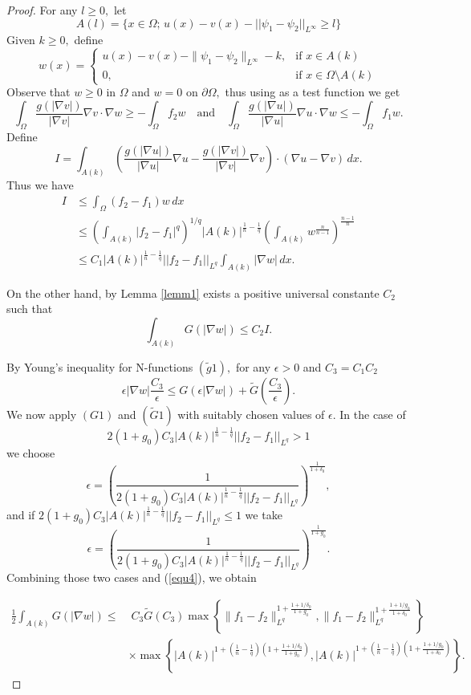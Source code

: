\documentclass[11pt, leqno]{article}
\theoremstyle{definition}
\theoremstyle{remark}
\numberwithin{equation}{section}
\begin{document}
\begin{proof}
  For any $l\geq 0,$ let
  $$A(l)=\{x\in \Omega;\,u(x)-v(x) - ||\psi_1-\psi_2||_{L^\infty}\geq l\} $$
 Given $k\geq 0,$ define
 \[
w(x) = 
\begin{cases}
    u(x) - v(x) - \|\psi_1 - \psi_2\|_{L^\infty} - k, & \text{if } x \in A(k) \\[4pt]
    0, & \text{if } x \in \Omega \setminus A(k)
\end{cases}
\]
Observe that $w\geq 0$ in $\Omega$ and $w=0$ on $\partial\Omega,$ thus using as a test function we get
$$\int_\Omega\frac{g(|\nabla v|)}{|\nabla v|}\nabla v\cdot\nabla w \geq -\int_\Omega f_2w \quad\text{and}\quad \int_\Omega\frac{g(|\nabla u|)}{|\nabla u|}\nabla u\cdot\nabla w \leq -\int_\Omega f_1w. $$
Define
 $$I=\int_{A(k)}\left(\frac{g(|\nabla u|)}{|\nabla u|}\nabla u - \frac{g(|\nabla v|)}{|\nabla v|}\nabla v\right)\cdot\left(\nabla u-\nabla v\right)\,dx. $$
Thus we have
 \begin{align*}
     I &\leq \int_\Omega(f_2-f_1)w\,dx\\
     &\leq \left(\int_{A(k)}|f_2-f_1|^q \right)^{1/q}|A(k)|^{\frac{1}{n}-\frac{1}{q}}\left(\int_{A(k)}w^{\frac{n}{n-1}}\right)^{\frac{n-1}{n}}\\
     &\leq C_1|A(k)|^{\frac{1}{n}-\frac{1}{q}}||f_2-f_1||_{L^q}\int_{A(k)}|\nabla w|\,dx.
 \end{align*}

On the other hand, by Lemma \ref{lemm1} exists a positive universal constante $C_2$ such that
 \begin{equation}\label{equ4}
     \int_{A(k)}G(|\nabla w|) \leq C_2 I.
 \end{equation}

By Young's inequality for N-functions $(\tilde{g}1),$ for any $\epsilon>0$ and $C_3=C_1C_2$
$$ \epsilon|\nabla w|\frac{C_3}{\epsilon} \leq G\left(\epsilon|\nabla w|\right) + \tilde{G}\left(\frac{C_3}{\epsilon}\right). $$
We now apply $(G1)$ and $(\tilde{G}1)$ with suitably chosen values of $\epsilon.$
In the case of $$2(1+g_0)C_3|A(k)|^{\frac{1}{n}-\frac{1}{q}}||f_2-f_1||_{L^q}>1$$ we choose
$$\epsilon= \left(\frac{1}{2(1+g_0)C_3|A(k)|^{\frac{1}{n}-\frac{1}{q}}||f_2-f_1||_{L^q}}\right)^{\frac{1}{1+\delta_0}},$$
and if $2(1+g_0)C_3|A(k)|^{\frac{1}{n}-\frac{1}{q}}||f_2-f_1||_{L^q}\leq 1$ we take
$$\epsilon= \left(\frac{1}{2(1+g_0)C_3|A(k)|^{\frac{1}{n}-\frac{1}{q}}||f_2-f_1||_{L^q}}\right)^{\frac{1}{1+g_0}}.$$
Combining those two cases and (\ref{equ4}), we obtain 

\begin{equation}\label{equ5}
\begin{aligned}
\frac{1}{2}\int_{A(k)} G(|\nabla w|) \leq &\; C_3\tilde{G}(C_3) \max\left\{ 
\|f_1-f_2\|_{L^q}^{1+ \frac{1+1/\delta_0}{1+g_0}}, 
\|f_1-f_2\|_{L^q}^{1+ \frac{1+1/g_0}{1+\delta_0}}
\right\} \\
&\times \max\left\{ |A(k)|^{1+\left(\frac{1}{n}-\frac{1}{q}\right)\left(1+\frac{1+1/\delta_0}{1+g_0} \right)}, |A(k)|^{1+\left(\frac{1}{n}-\frac{1}{q}\right)\left(1+\frac{1+1/g_0}{1+\delta_0} \right)} \right\}.
\end{aligned}
\end{equation}


\end{proof}
\end{document}
